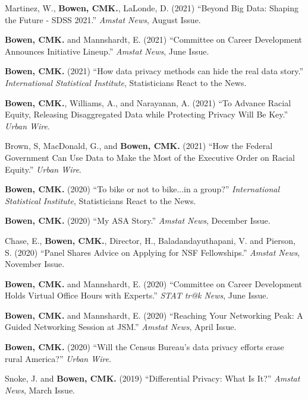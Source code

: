 \documentclass[11pt, letterpaper, roman]{moderncv} %
\begin{document}
\begin{etaremune}[topsep=0pt, itemsep=3pt, partopsep=0pt, parsep=0pt]
    \item Martinez, W., \textbf{Bowen, CMK.}, LaLonde, D. (2021) ``Beyond Big Data: Shaping the Future - SDSS 2021.'' \textit{Amstat News}, August Issue.   
    
    \item \textbf{Bowen, CMK.} and Mannshardt, E. (2021) ``Committee on Career Development Announces Initiative Lineup.'' \textit{Amstat News}, June Issue.

    \item \textbf{Bowen, CMK.} (2021) ``How data privacy methods can hide the real data story.'' \textit{International Statistical Institute}, Statisticians React to the News.
    
    \item \textbf{Bowen, CMK.}, Williams, A., and Narayanan, A. (2021) ``To Advance Racial Equity, Releasing Disaggregated Data while Protecting Privacy Will Be Key.'' \textit{Urban Wire}. 
    
    \item Brown, S, MacDonald, G., and \textbf{Bowen, CMK.} (2021) ``How the Federal Government Can Use Data to Make the Most of the Executive Order on Racial Equity.'' \textit{Urban Wire}. 

    \item \textbf{Bowen, CMK.} (2020) ``To bike or not to bike...in a group?'' \textit{International Statistical Institute}, Statisticians React to the News.

    \item \textbf{Bowen, CMK.} (2020) ``My ASA Story.'' \textit{Amstat News}, December Issue.

    \item Chase, E., \textbf{Bowen, CMK.}, Director, H., Baladandayuthapani, V. and Pierson, S. (2020) ``Panel Shares Advice on Applying for NSF Fellowships.'' \textit{Amstat News}, November Issue.

    \item \textbf{Bowen, CMK.} and Mannshardt, E. (2020) ``Committee on Career Development Holds Virtual Office Hours with Experts.'' \textit{STAT tr@k News}, June Issue.

    \item \textbf{Bowen, CMK.} and Mannshardt, E. (2020) ``Reaching Your Networking Peak: A Guided Networking Session at JSM.'' \textit{Amstat News}, April Issue.
    
    \item \textbf{Bowen, CMK.} (2020) ``Will the Census Bureau's data privacy efforts erase rural America?'' \textit{Urban Wire}. 
    
    \item Snoke, J. and \textbf{Bowen, CMK.} (2019) ``Differential Privacy: What Is It?'' \textit{Amstat News}, March Issue.
\end{etaremune}
\end{document}
